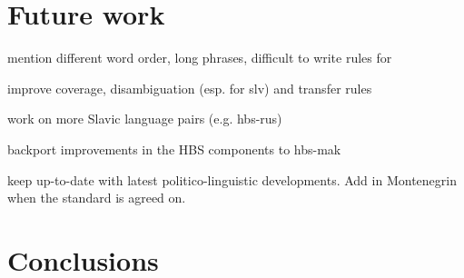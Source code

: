 \section{Future work}

mention different word order, long phrases, difficult to write rules for

improve coverage, disambiguation (esp. for slv) and transfer rules

work on more Slavic language pairs (e.g. hbs-rus)

backport improvements in the HBS components to hbs-mak

keep up-to-date with latest politico-linguistic developments. Add in
 Montenegrin when the standard is agreed on.


\section{Conclusions}
